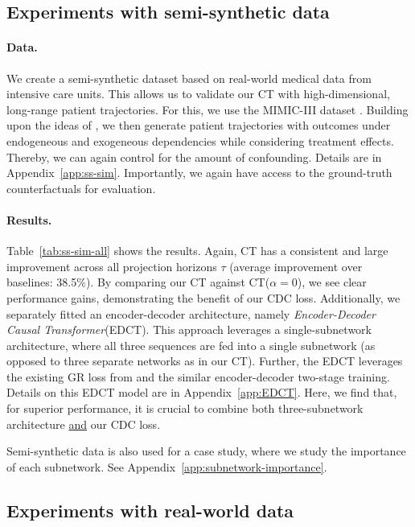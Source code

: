 \documentclass{article}
\theoremstyle{plain}
\theoremstyle{definition}
\theoremstyle{remark}
\newcommand{\longname}{\emph{Causal Transformer}\xspace}
\newcommand{\shortname}{CT\xspace}
\begin{document}
\subsection{Experiments with semi-synthetic data}


\paragraph{Data.} We create a semi-synthetic dataset based on real-world medical data from intensive care units. This allows us to validate our \shortname with high-dimensional, long-range patient trajectories. For this, we use the MIMIC-III dataset \cite{johnson2016mimic}. Building upon the ideas of \cite{schulam2017reliable}, we then generate patient trajectories with outcomes under endogeneous and exogeneous dependencies while considering treatment effects. Thereby, we can again control for the amount of confounding. Details are in Appendix~\ref{app:ss-sim}. Importantly, we again have access to the ground-truth counterfactuals for evaluation.  


\paragraph{Results.} Table~\ref{tab:ss-sim-all} shows the results. Again, \shortname has a consistent and large improvement across all projection horizons $\tau$ (average improvement over baselines: 38.5\%). By comparing our \shortname against \shortname($\alpha = 0$), we see clear performance gains, demonstrating the benefit of our CDC loss. Additionally, we separately fitted an encoder-decoder architecture, namely \emph{Encoder-Decoder} \longname (EDCT). This approach leverages a single-subnetwork architecture, where all three sequences are fed into a single subnetwork (as opposed to three separate networks as in our \shortname). Further, the EDCT leverages the existing GR loss from \cite{bica2020estimating} and the similar encoder-decoder two-stage training. Details on this EDCT model are in Appendix~\ref{app:EDCT}. Here, we find that, for superior performance, it is crucial to combine both three-subnetwork architecture \underline{and} our CDC loss. 

Semi-synthetic data is also used for a case study, where we study the importance of each subnetwork. See Appendix~\ref{app:subnetwork-importance}.


\subsection{Experiments with real-world data}
\end{document}
